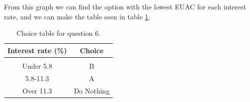 \documentclass[letterpaper, reqno,11pt]{article}
\begin{document}
From this graph we can find the option with the lowest EUAC for each interest rate, and we can make the table seen in table \ref{tab:q6}. 

\begin{table}[htpb]
    \centering
    \caption{Choice table for question 6. }
    \label{tab:q6}
    \begin{tabular}{c|c}
        Interest rate (\%)&Choice\\
        \hline\\
        Under 5.8&B\\
        5.8-11.3&A\\
        Over 11.3&Do Nothing

    \end{tabular}
\end{table}
\end{document}
